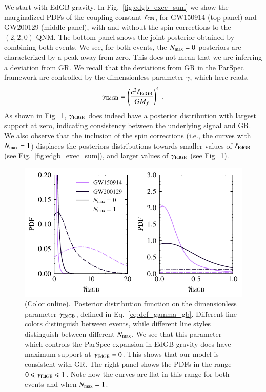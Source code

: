 \documentclass[twocolumn,
               prd,
               aps,
               superscriptaddress,
               tightenlines,
               nofootinbib,
               eqsecnum,
               amsfonts,
               amsmath,
               longbibliography]{revtex4-1}
\begin{document}
We start with EdGB gravity.
%
In Fig.~\ref{fig:edgb_exec_sum} we show the marginalized PDFs of the
coupling constant $\ell_{\rm GB}$, for GW150914 (top panel) and GW200129
(middle panel), with and without the spin corrections to the $(2,2,0)$ QNM.
%
The bottom panel shows the joint posterior obtained by combining both events.
%
We see, for both events, the $N_{\rm max} = 0$ posteriors are
characterized by a peak away from zero.
%
This does not mean that we are inferring a deviation from GR.
%
We recall that the deviations from GR in the ParSpec framework are controlled
by the dimensionless parameter $\gamma$, which here reads,
%
\begin{equation}
    \gamma_{\rm EdGB} = \left(\frac{c^2 \ell_{\rm EdGB}}{ G M_{f}}\right)^4\,.
    \label{eq:def_gamma_gb}
\end{equation}
%
As shown in Fig.~\ref{fig:gamma_gb}, $\gamma_{\rm EdGB}$ does indeed have a posterior
distribution with largest support at zero, indicating consistency between
the underlying signal and GR.
%
We also observe that the inclusion of the spin corrections (i.e., the curves with $N_{\rm max} = 1$)
displaces the posteriors distributions towards smaller values of $\ell_{\rm EdGB}$ (see Fig.~\ref{fig:edgb_exec_sum}),
and larger values of $\gamma_{\rm EdGB}$ (see Fig.~\ref{fig:gamma_gb}).

\begin{figure}[t]
\includegraphics[width=\columnwidth]{figs/edgb_gamma.pdf}
\caption{(Color online).~Posterior distribution function on the dimensionless parameter $\gamma_{\rm EdGB}$,
defined in Eq.~\eqref{eq:def_gamma_gb}. Different line colors distinguish between events, while
different line styles distinguish between different $N_{\rm max}$.
%
We see that this parameter which controls the ParSpec expansion in EdGB gravity
does have maximum support at $\gamma_{\rm EdGB} = 0$. This shows that our model is consistent with GR.
The right panel shows the PDFs in the range $0 \leqslant \gamma_{\rm EdGB} \leqslant 1$. Note how
the curves are flat in this range for both events and when $N_{\rm max} = 1$.}
\label{fig:gamma_gb}
\end{figure}
\end{document}

